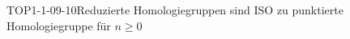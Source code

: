 
\begin{PROP}{TOP1-1-09-10}{Reduzierte Homologiegruppen sind ISO zu punktierte Homologiegruppe für $n\geq 0$}
\end{PROP}
